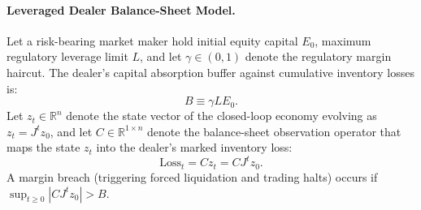 \documentclass[12pt]{article}
\theoremstyle{definition}
\theoremstyle{remark}
\newcommand{\R}{\mathbb{R}}
\begin{document}
\paragraph{Leveraged Dealer Balance-Sheet Model.}
Let a risk-bearing market maker hold initial equity capital $E_0$, maximum regulatory leverage limit $L$, and let $\gamma \in (0, 1)$ denote the regulatory margin haircut. The dealer's capital absorption buffer against cumulative inventory losses is:
\begin{equation}
B \equiv \gamma L E_0.
\label{eq:dealer_buffer}
\end{equation}
Let $z_t \in \R^n$ denote the state vector of the closed-loop economy evolving as $z_t = J^t z_0$, and let $C \in \R^{1 \times n}$ denote the balance-sheet observation operator that maps the state $z_t$ into the dealer's marked inventory loss:
\begin{equation}
\text{Loss}_t = C z_t = C J^t z_0.
\end{equation}
A margin breach (triggering forced liquidation and trading halts) occurs if $\sup_{t \ge 0} |C J^t z_0| > B$.
\end{document}
